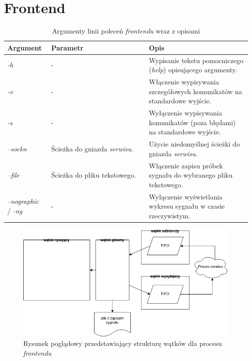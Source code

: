 \newpage

\section{Frontend}

\begin{table}[h!]
\centering
    \caption{Argumenty linii poleceń \textit{frontendu} wraz z opisami}
\label{tab:frontend-cmd-args}
    \begin{tabular}{|p{0.18\linewidth}|p{0.4\linewidth}|p{0.42\linewidth}|}
\hline
    \textbf{Argument} & \textbf{Parametr} & \textbf{Opis}        \\ \hline
    \textit{-h} & - & Wypisanie tekstu pomocniczego (\textit{help}) opisującego argumenty.\\ \hline
    \textit{-v} & - & Włączenie wypisywania szczegółowych komunikatów na standardowe wyjście.   \\ \hline
    \textit{-s} & - & Wyłączenie wypisywania komunikatów (poza błędami) na standardowe wyjście. \\ \hline
    \textit{--sockn} & Ścieżka do gniazda \textit{serwisu}. & Użycie niedomyślnej ścieżki do gniazda \textit{serwisu}. \\ \hline
    \textit{--file} & Ścieżka do pliku tekstowego. & Włączenie zapisu próbek sygnału do wybranego pliku tekstowego. \\ \hline
    \textit{--nographic} / \textit{-ng} & - & Wyłączenie wyświetlania wykresu sygnału w czasie rzeczywistym. \\ \hline
\end{tabular}
\end{table}

\begin{figure}[h!]
    \centering 
    \includegraphics[scale=0.7]{pl/media/app_ipc.png}
    \caption{Rysunek poglądowy przedstawiający strukturę wątków dla procesu \textit{frontendu}}
    \label{fig:app_ipc}
\end{figure}

